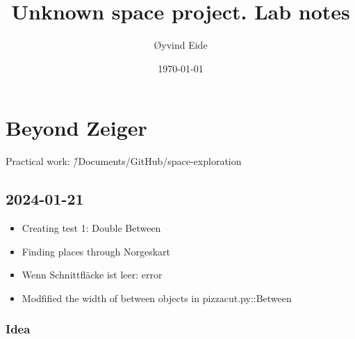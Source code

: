\documentclass[12pt]{book}
\begin{document}
\title{Unknown space project. Lab notes}

\author{Øyvind Eide}

\date{\today}



\setlength{\parindent}{0cm}
\setlength{\parskip}{3mm}
\let\stdsection\section

\chapter{Beyond Zeiger}

Practical work: \~/Documents/GitHub/space-exploration

\section{2024-01-21}

\begin{itemize}
\item Creating test 1: Double Between

\item Finding places through Norgeskart

\item Wenn Schnittfläcke ist leer: error

\item Modfified the width of between objects in pizzacut.py::Between

\end{itemize}

\subsection{Idea}
\end{document}
